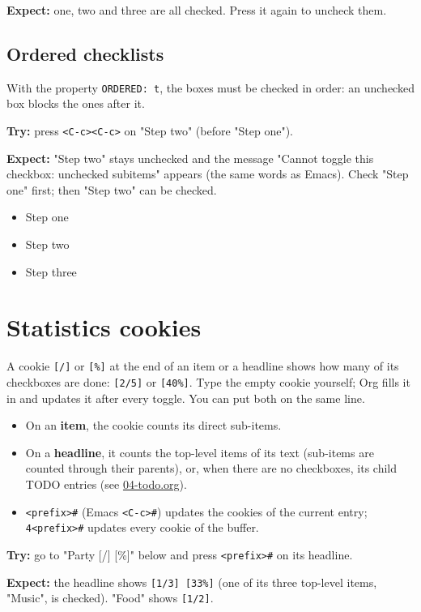 \textbf{Expect:} one, two and three are all checked. Press it again to uncheck
them.
\subsection{Ordered checklists}
\label{sec:org302e170}
With the property \texttt{ORDERED: t}, the boxes must be checked in order: an
unchecked box blocks the ones after it.

\textbf{Try:} press \texttt{<C-c><C-c>} on "Step two" (before "Step one").

\textbf{Expect:} "Step two" stays unchecked and the message "Cannot toggle this
checkbox: unchecked subitems" appears (the same words as Emacs). Check
"Step one" first; then "Step two" can be checked.

\begin{itemize}
\item[{$\square$}] Step one
\item[{$\square$}] Step two
\item[{$\square$}] Step three
\end{itemize}
\section{Statistics cookies}
\label{sec:org45cb940}
A cookie \texttt{[/]} or \texttt{[\%]} at the end of an item or a headline shows how many
of its checkboxes are done: \texttt{[2/5]} or \texttt{[40\%]}. Type the empty cookie
yourself; Org fills it in and updates it after every toggle. You can put
both on the same line.

\begin{itemize}
\item On an \textbf{item}, the cookie counts its direct sub-items.
\item On a \textbf{headline}, it counts the top-level items of its text (sub-items are
counted through their parents), or, when there are no checkboxes, its
child TODO entries (see \href{04-todo.org}{04-todo.org}).
\item \texttt{<prefix>\#} (Emacs \texttt{<C-c>\#}) updates the cookies of the current entry;
\texttt{4<prefix>\#} updates every cookie of the buffer.
\end{itemize}

\textbf{Try:} go to "Party [/] [\%]" below and press \texttt{<prefix>\#} on its headline.

\textbf{Expect:} the headline shows \texttt{[1/3] [33\%]} (one of its three top-level
items, "Music", is checked). "Food" shows \texttt{[1/2]}.

